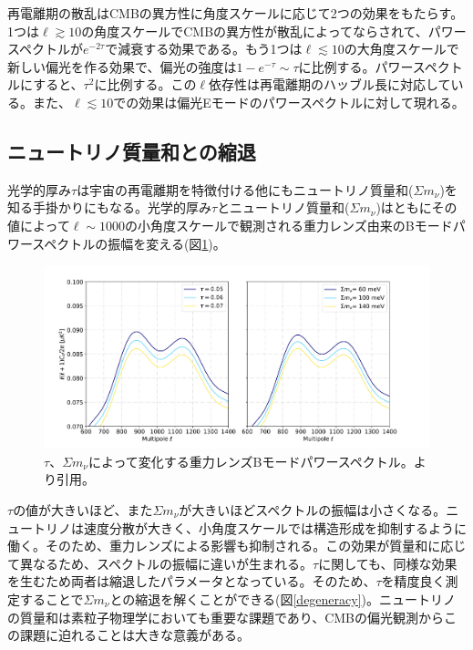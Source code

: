 再電離期の散乱はCMBの異方性に角度スケールに応じて2つの効果をもたらす。1つは$\ell\gtrsim 10$の角度スケールでCMBの異方性が散乱によってならされて、パワースペクトルが$e^{-2\tau}$で減衰する効果である。もう1つは$\ell\lesssim 10$の大角度スケールで新しい偏光を作る効果で、偏光の強度は$1-e^{-\tau}\sim\tau$に比例する。パワースペクトルにすると、$\tau^{2}$に比例する。この$\ell$依存性は再電離期のハッブル長に対応している。また、$\ell\lesssim 10$での効果は偏光Eモードのパワースペクトルに対して現れる。

\subsection{ニュートリノ質量和との縮退}
光学的厚み$\tau$は宇宙の再電離期を特徴付ける他にもニュートリノ質量和($\Sigma m_{\nu}$)を知る手掛かりにもなる。光学的厚み$\tau$とニュートリノ質量和($\Sigma m_{\nu}$)はともにその値によって$\ell\sim 1000$の小角度スケールで観測される重力レンズ由来のBモードパワースペクトルの振幅を変える(図\ref{tau_mass})。
\begin{figure}[htbp]
  \centering
  \includegraphics[width=0.8\columnwidth]{2_cosmology/figs/tau_mass.png}
  \caption{$\tau$、$\Sigma m_{\nu}$によって変化する重力レンズBモードパワースペクトル。\cite{sueno_doctor}より引用。}
  \label{tau_mass}
\end{figure}
$\tau$の値が大きいほど、また$\Sigma m_{\nu}$が大きいほどスペクトルの振幅は小さくなる。ニュートリノは速度分散が大きく、小角度スケールでは構造形成を抑制するように働く。そのため、重力レンズによる影響も抑制される。この効果が質量和に応じて異なるため、スペクトルの振幅に違いが生まれる。$\tau$に関しても、同様な効果を生むため両者は縮退したパラメータとなっている。そのため、$\tau$を精度良く測定することで$\Sigma m_{\nu}$との縮退を解くことができる(図\ref{degeneracy})。ニュートリノの質量和は素粒子物理学においても重要な課題であり、CMBの偏光観測からこの課題に迫れることは大きな意義がある。
